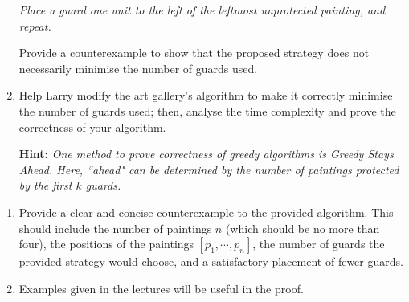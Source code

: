 \documentclass[12pt]{article}
\begin{document}
\begin{question}
\begin{enumerate}
\textit{Place a guard one unit to the left of the leftmost unprotected painting, and repeat.}

Provide a counterexample to show that the proposed strategy does not necessarily minimise the number of guards used.

\item Help Larry modify the art gallery's algorithm to make it correctly minimise the number of guards used; then, analyse the time complexity and prove the correctness of your algorithm.

\textbf{Hint:} \emph{One method to prove correctness of greedy algorithms is \emph{Greedy Stays Ahead}. Here, ``ahead" can be determined by the number of paintings protected by the first $k$ guards.}
\end{enumerate}
\end{question}

\clearpage

\begin{rubric}
\begin{enumerate}
    \item  Provide a clear and concise counterexample to the provided algorithm. This should include the number of paintings $n$ (which should be no more than four), the positions of the paintings $[p_1, \cdots, p_n]$, the number of guards the provided strategy would choose, and a satisfactory placement of fewer guards.
    \item Examples given in the lectures will be useful in the proof.

\end{enumerate}
\end{rubric}
\clearpage
\begin{solution}
\end{solution}
\begin{attribution}
\end{attribution}
\end{document}
